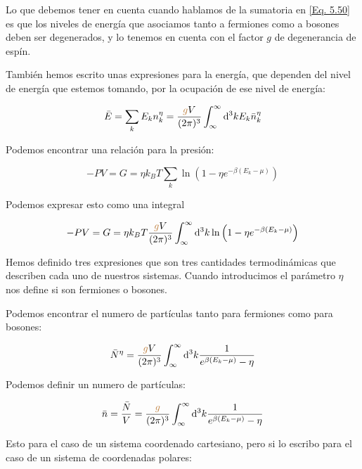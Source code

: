 \documentclass[11pt,fleqn]{book}
\begin{document}
Lo que debemos tener en cuenta cuando hablamos de la sumatoria en \ref{Eq. 5.50} es que los niveles de energía que asociamos tanto a fermiones como a bosones deben ser degenerados, y lo tenemos en cuenta con el factor $g$ de degenerancia de espín.

También hemos escrito unas expresiones para la energía, que dependen del nivel de energía que estemos tomando, por la ocupación de ese nivel de energía:

\begin{equation}
    \bar{E}=\sum_{k}E_{k}n_{k}^{\eta}=\frac{{\color{brown}g}V}{(2\pi)^{3}}\int_{\infty}^{{\infty}}\mathrm{d}^{3}kE_{k}\bar{n}_{k}^{\eta}
\end{equation}

Podemos encontrar una relación para la presión:

\begin{equation}
    -PV=G=\eta k_{B}T\sum_{k}\ln{\left(1-\eta e^{-\beta(E_{k}-\mu)}\right)}
\end{equation}

Podemos expresar esto como una integral

\begin{equation}
    -PV=G=\eta k_{B}T\frac{{\color{brown}g}V}{(2\pi)^{3}}\int_{\infty}^{\infty}\mathrm{d}^{3}k \ln{\left(1-\eta e^{-\beta(E_{k}-\mu)}\right)}
    \label{Eq. 5.54}
\end{equation}

Hemos definido tres expresiones que son tres cantidades termodinámicas que describen cada uno de nuestros sistemas. Cuando introducimos el parámetro $\eta$ nos define si son fermiones o bosones.

Podemos encontrar el numero de partículas tanto para fermiones como para bosones:

\begin{equation*}
    \bar{N}^{\eta}=\frac{{\color{brown}g}V}{(2\pi)^{3}}\int_{\infty}^{{\infty}}\mathrm{d}^{3}k\frac{1}{e^{\beta(E_{k}-\mu)}-\eta}
\end{equation*}

Podemos definir un numero de partículas:

\begin{equation*}
    \bar{n}=\frac{\bar{N}}{V}=\frac{{\color{brown}g}}{(2\pi)^{3}}\int_{\infty}^{{\infty}}\mathrm{d}^{3}k\frac{1}{e^{\beta(E_{k}-\mu)}-\eta}
\end{equation*}

Esto para el caso de un sistema coordenado cartesiano, pero si lo escribo para el caso de un sistema de coordenadas polares:
\end{document}
